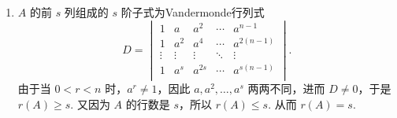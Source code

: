 \begin{enumerate}
    \item $A$ 的前 $s$ 列组成的 $s$ 阶子式为Vandermonde行列式
          \[D = \begin{vmatrix}
                  1      & a      & a^2    & \cdots & a^{n-1}    \\
                  1      & a^2    & a^4    & \cdots & a^{2(n-1)} \\
                  \vdots & \vdots & \vdots & \ddots & \vdots     \\
                  1      & a^s    & a^{2s} & \cdots & a^{s(n-1)} \\
              \end{vmatrix}.\]
          由于当 $0 < r < n$ 时，$a^r \neq 1$，因此 $a, a^2, \ldots, a^s$ 两两不同，进而 $D \neq 0$，于是 $r(A) \geqslant s$. 又因为 $A$ 的行数是 $s$，所以 $r(A) \leqslant s$. 从而 $r(A) = s$.


\end{enumerate}

